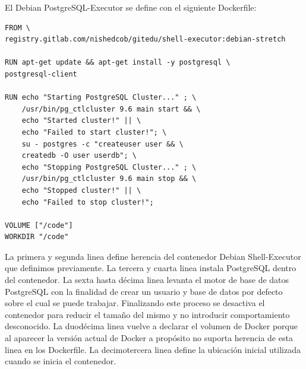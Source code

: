 El Debian PostgreSQL-Executor se define con el siguiente Dockerfile:
\begin{lstlisting}
FROM \
registry.gitlab.com/nishedcob/gitedu/shell-executor:debian-stretch

RUN apt-get update && apt-get install -y postgresql \
postgresql-client

RUN echo "Starting PostgreSQL Cluster..." ; \
    /usr/bin/pg_ctlcluster 9.6 main start && \
    echo "Started cluster!" || \
    echo "Failed to start cluster!"; \
    su - postgres -c "createuser user && \
    createdb -O user userdb"; \
    echo "Stopping PostgreSQL Cluster..." ; \
    /usr/bin/pg_ctlcluster 9.6 main stop && \
    echo "Stopped cluster!" || \
    echo "Failed to stop cluster!";

VOLUME ["/code"]
WORKDIR "/code"
\end{lstlisting}
La primera y segunda linea define herencia del contenedor Debian Shell-Executor que definimos previamente. La tercera y cuarta linea instala PostgreSQL dentro del contenedor. La sexta hasta décima linea levanta el motor de base de datos PostgreSQL con la finalidad de crear un usuario y base de datos por defecto sobre el cual se puede trabajar. Finalizando este proceso se desactiva el contenedor para reducir el tamaño del mismo y no introducir comportamiento desconocido. La duodécima linea vuelve a declarar el volumen de Docker porque al aparecer la versión actual de Docker a propósito no suporta herencia de esta linea en los Dockerfile. La decimotercera linea define la ubicación inicial utilizada cuando se inicia el contenedor.

